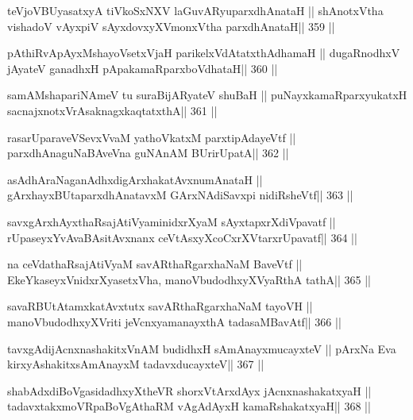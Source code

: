 \begin{shl}
teVjoVBUyasatxyA tiVkoSxNXV laGuvARyuparxdhAnataH ||
shAnotxV\s tha vishadoV vAyxpiV sAyxdovxyXVmonxV\s tha parxdhAnataH\hfill || 359 ||
\end{shl}

\begin{shl}
pAthiRvApAyxMshayoVsetxVjaH parikelxVdAtatxthA\s dhamaH ||
dugaRnodhxV jAyateV ganadhxH pApakamaRparxboVdhataH\hfill || 360 ||
\end{shl}

\begin{shl}
samAMshapariNAmeV tu suraBijARyateV shuBaH ||
puNayxkamaRparxyukatxH sacnajxnotxVrAsaknagxkaqtatxthA\hfill || 361 ||
\end{shl}

\begin{shl}
rasarUparaveVSevxVvaM yathoVkatxM parxtipAdayeVtf ||
parxdhAnaguNaBAveVna guNAnAM BUrirUpatA\hfill || 362 ||
\end{shl}

\begin{shl}
asAdhAraNaganAdhxdigArxhakatAvxnumAnataH ||
gArxhayxBUtaparxdhAnatavxM GArxNAdiSavxpi nidiRsheVtf\hfill || 363 ||
\end{shl}

\begin{shl}
savxgArxhAyxthaRsajAtiVyaminidxrXyaM sAyxtapxrXdiVpavatf ||
rUpaseyxYvAvaBAsitAvxnanx ceVtAsxyXcoCxrXVtarxrUpavatf\hfill || 364 ||
\end{shl}

\begin{shl}
na ceVdathaRsajAtiVyaM savARthaRgarxhaNaM BaveVtf ||
EkeYkaseyxVnidxrXyasetxVha, manoVbudodhxyXVyaRthA tathA\hfill || 365 ||
\end{shl}

\begin{shl}
savaRBUtAtamxkatAvxtutx savARthaRgarxhaNaM tayoVH ||
manoVbudodhxyXVriti jeVcnxyamanayxthA tadasaMBavAtf\hfill || 366 ||
\end{shl}

\begin{shl}
tavxgAdijAcnxnashakitxVnAM budidhxH sAmAnayxmucayxteV ||
pArxNa Eva kirxyAshakitxsAmAnayxM tadavxducayxteV\hfill || 367 ||
\end{shl}

\begin{shl}
shabAdxdiBoVgasidadhxyXtheVR shorxVtArxdAyx jAcnxnashakatxyaH ||
tadavxtakxmoVRpaBoVgAthaRM vAgAdAyxH kamaRshakatxyaH\hfill || 368 ||
\end{shl}

